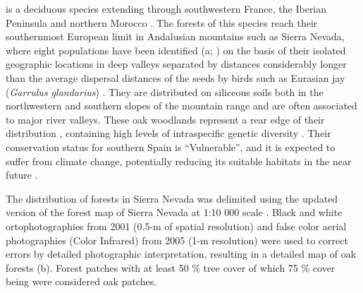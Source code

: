 \Qpy is a deciduous species extending through southwestern France, the Iberian Peninsula and northern Morocco \autocite{Franco1990Quercus}. The forests of this species reach their southernmost European limit in Andalusian mountains such as Sierra Nevada, where eight populations have been identified (a; ) on the basis of their isolated geographic locations in deep valleys separated by distances considerably longer than the average dispersal distances of the seeds by birds such as Eurasian jay (\emph{Garrulus glandarius}) \autocite{Gomez2003SpatialPatterns,ValbuenaCarabanaetal2005GeneFlow}. They are distributed on siliceous soils both in the northwestern and southern slopes of the mountain range and are often associated to major river valleys. These oak woodlands represent a rear edge of their distribution \autocite{HampePetit2005ConservingBiodiversity}, containing high levels of intraspecific genetic diversity \autocite{ValbuenaCarabanaGil2013GeneticResilience}. Their conservation status for southern Spain is ``Vulnerable'', and it is expected to suffer from climate change, potentially reducing its suitable habitats in the near future \autocite{GeaIzquierdoetal2013GrowthProjections,GeaIzquierdoetal2017RiskyFuture}.

The distribution of \Qp forests in Sierra Nevada was delimited using the updated version of the forest map of Sierra Nevada at 1:10 000 scale \autocite{CMAOT2014CartografiaEvaluacion,PerezLuqueetal2019MapEcosystems}. Black and white ortophotographies from 2001 (0.5-m of spatial resolution) and false color aerial photographies (Color Infrared) from 2005 (1-m resolution) were used to correct errors by detailed photographic interpretation, resulting in a detailed map of oak forests (b). Forest patches with at least 50 \% tree cover of which 75 \% cover being \Qp were considered oak patches.

